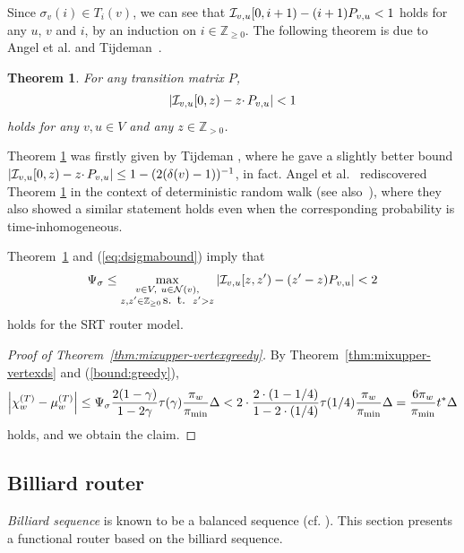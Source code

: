 \documentclass[letter, 11pt]{article}
\newcommand{\1}{\mbox{1}\hspace{-0.25em}\mbox{l}}
\newcommand{\I}{{\cal I}} \newcommand{\C}{{\cal C}} \newcommand{\dtv}{{\cal D}_{\rm tv}}
\newtheorem{theorem}{Theorem}[section]
\begin{document}
 Since $\sigma_v(i) \in T_i(v)$,  
  we can see that $\I_{v, u}[0, i+1) - (i+1)P_{v, u} < 1$ holds 
  for any $u$, $v$ and $i$, 
  by an induction on $i \in \mathbb{Z}_{\geq 0}$. 
 The following theorem is 
  due to Angel et al. \cite{AJJ10} and Tijdeman~\cite{T80}.
\begin{theorem}\cite{T80, AJJ10}
\label{thm:upper-const}
 For any transition matrix $P$, 
\begin{eqnarray*}
 \left|\I_{v, u}[0, z)- z\cdotp P_{v,u}\right| < 1
\end{eqnarray*}
 holds for any $v, u\in V$ and any $z \in \mathbb{Z}_{> 0}$. 
\end{theorem}
Theorem \ref{thm:upper-const} was firstly given by Tijdeman \cite{T80}, 
   where he gave a slightly better bound 
  $\left|\I_{v, u}[0, z)- z\cdotp P_{v,u}\right|\leq 1-(2(\delta(v)-1))^{-1}$, in fact. 
 Angel et al.~\cite{AJJ10} rediscovered Theorem \ref{thm:upper-const} 
   in the context of deterministic random walk (see also~\cite{HP10}), 
  where they also showed a similar statement holds 
  even when the corresponding probability is time-inhomogeneous.  

Theorem~\ref{thm:upper-const} and (\ref{eq:dsigmabound}) imply that 
\begin{eqnarray}
 \dsig 
 \leq 
 \max_{\substack{v\in V, \ u\in {\cal N}(v), \\ z, z' \in \mathbb{Z}_{\geq 0} \, \mbox{s. t. }\, z'>z }}
 \left| \I_{v, u}[z, z')-(z'-z)  P_{v,u}\right|< 2
\label{bound:greedy}
\end{eqnarray}
 holds for the SRT router model. 
 
 
\begin{proof}[Proof of Theorem~\ref{thm:mixupper-vertexgreedy}]
By Theorem~\ref{thm:mixupper-vertexds} and (\ref{bound:greedy}), 
\begin{eqnarray*}
\left|\chi_w^{(T)}-\mu_w^{(T)}\right|
\leq \Psi_\sigma \frac{2(1-\gamma )}{1-2\gamma }\tau(\gamma )\frac{\pi_w}{\pi_{\min}}\Delta 
< 2\cdot \frac{2\cdot(1-1/4)}{1-2\cdot (1/4)}\tau(1/4) \frac{\pi_w}{\pi_{\min}}\Delta 
= \frac{6\pi_w}{\pi_{\min}} t^* \Delta
\end{eqnarray*}
holds, and we obtain the claim. 
\end{proof}

\subsection{Billiard router}\label{sec:billiard}{\em Billiard sequence} is known to be a balanced sequence (cf. \cite{SMK04}). 
This section presents a functional router based on the billiard sequence. 
\end{document}
